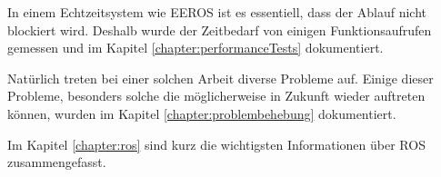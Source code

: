 In einem Echtzeitsystem wie EEROS ist es essentiell, dass der Ablauf nicht blockiert wird.
Deshalb wurde der Zeitbedarf von einigen Funktionsaufrufen gemessen und im Kapitel \ref{chapter:performanceTests} dokumentiert.

Natürlich treten bei einer solchen Arbeit diverse Probleme auf.
Einige dieser Probleme, besonders solche die möglicherweise in Zukunft wieder auftreten können, wurden im Kapitel \ref{chapter:problembehebung} dokumentiert.

Im Kapitel \ref{chapter:ros} sind kurz die wichtigsten Informationen über ROS zusammengefasst.
